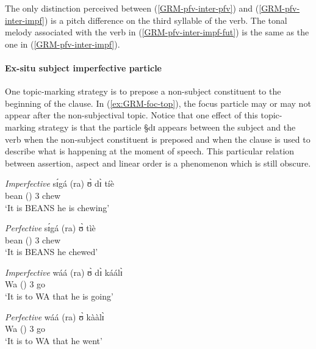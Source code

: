 The only distinction perceived between (\ref{GRM-pfv-inter-pfv})  and
(\ref{GRM-pfv-inter-impf}) is a pitch difference on the third syllable of the
verb. The tonal melody associated with the verb in 
(\ref{GRM-pfv-inter-impf-fut}) is the
same as the one in (\ref{GRM-pfv-inter-impf}).







\paragraph{Ex-situ subject imperfective particle}
\label{sec:GRM-ipfv-part}

One topic-marking strategy is to prepose a non-subject constituent to the
beginning of the clause.  In  (\ref{ex:GRM-foc-top}),  the focus particle may or
may not
appear after the non-subjectival topic. Notice that one effect of this 
topic-marking strategy is that the particle {\S dɪ} appears between the subject
and
the verb when the non-subject constituent is preposed and when the clause is
used to describe what is happening at the moment of speech. This particular
relation between  assertion, aspect and linear order is a phenomenon
which is still obscure.



\begin{exe}
\ex\label{ex:GRM-foc-top}
\begin{xlist}
 \ex\label{ex:GRM-foc-top-chew-pres.prog}{\it Imperfective}
\gll  sɪ́gá (ra)  ʊ̀ dɪ̀  tíè   \\
 bean  ({\foc}) {3\sg} {\ipfv} chew\\
\glt `It is BEANS he is chewing'


 \ex\label{ex:GRM-foc-top-chew-pres.prog}{\it Perfective}
\gll  sɪ́gá (ra) ʊ̀   tìè     \\
 bean  ({\foc}) {3\sg}  chew \\
\glt `It is BEANS he chewed'

 \ex\label{ex:GRM-foc-top-go-pres.prog}{\it Imperfective}
\gll   wáá (ra) ʊ̀ dɪ̀  káálɪ̀   \\
Wa    ({\foc}) {3\sg} {\ipfv} go\\
\glt `It is to WA that he is going'


 \ex\label{ex:GRM-foc-top-go-pres.prog}{\it Perfective}
\gll   wáá (ra)  ʊ̀ kààlɪ̀    \\
Wa   ({\foc}) {3\sg}  go\\
\glt `It is to WA that he went'

\end{xlist}
\end{exe}

